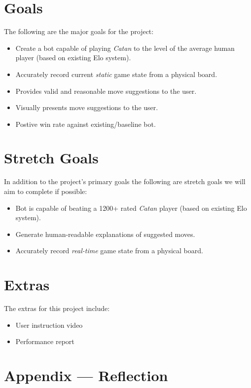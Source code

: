 \documentclass{article}
\begin{document}
\section{Goals}\label{sec:goals}
The following are the major goals for the project:
\begin{itemize}
    \item Create a bot capable of playing \emph{Catan} to the level of the average human player (based on existing Elo system).
    \item Accurately record current \emph{static} game state from a physical board.
    \item Provides valid and reasonable move suggestions to the user.
    \item Visually presents move suggestions to the user.
    \item Postive win rate against existing/baseline bot.
\end{itemize}

\section{Stretch Goals}\label{sec:stretch-goals}
In addition to the project’s primary goals the following are stretch goals we will aim to complete if possible:
\begin{itemize}
    \item Bot is capable of beating a 1200+ rated \emph{Catan} player (based on existing Elo system).
    \item Generate human-readable explanations of suggested moves.
    \item Accurately record \emph{real-time} game state from a physical board.
\end{itemize}


\section{Extras}\label{sec:extras}


\raggedright

The extras for this project include:
\begin{itemize}
    \item User instruction video
    \item Performance report
\end{itemize}

\newpage{}

\section*{Appendix --- Reflection}
\end{document}

